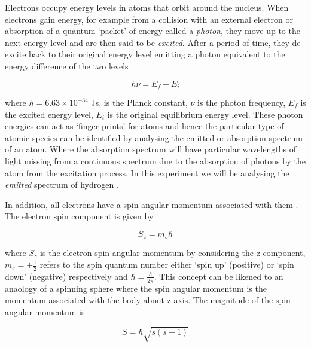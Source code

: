 \documentclass{article}
\begin{document}
\vspace{2mm}
\noindent
Electrons occupy energy levels in atoms that orbit around the nucleus. When electrons gain energy, for example from a collision with an external electron or absorption of a quantum  `packet' of energy called a \textit{photon}, they move up to the next energy level and are then said to be \textit{excited}. After a  period of time, they de-excite back to their original energy level emitting a photon equivalent to the energy difference of the two levels 

\begin{equation}
\label{eq:energy-diff}
h \nu = E_f - E_i
\end{equation}

\vspace{2mm}
\noindent
where $h = 6.63 \times 10^{-34}$ Js, is the Planck constant, $\nu$ is the photon frequency, $E_f$ is the excited energy level, $E_i$ is the original equilibrium energy level. These photon energies can act as `finger prints' for atoms and hence the particular type of atomic species can be identified by analysing the emitted or absorption spectrum of an atom. Where the absorption spectrum will have particular wavelengths of light missing from a continuous spectrum due to the absorption of photons by the atom from the excitation process. 
In this experiment we will be analysing the \textit{emitted} spectrum of hydrogen \cite{Paper01}.

\vspace{2mm}
\noindent
In addition, all electrons have a spin angular momentum associated with them \cite{Paper02}. The electron spin component is given by

\begin{equation}
\label{eq:spin}
S_z = m_s\hbar
\end{equation}

\vspace{2mm}
\noindent
where $S_z$ is the electron spin angular momentum by considering the z-component, $m_s = \pm\frac{1}{2}$ refers to the spin quantum number either `spin up' (positive) or `spin down' (negative) respectively and $\hbar = \frac{h}{2\pi}$. This concept can be likened to an anaology of a spinning sphere \cite{Book01} where the spin angular momentum is the momentum associated with the body about z-axis. The magnitude of the spin angular momentum is

\begin{equation}
\label{eq:spin-magnitude}
S = \hbar\sqrt{s(s+1)}
\end{equation}
\end{document}
